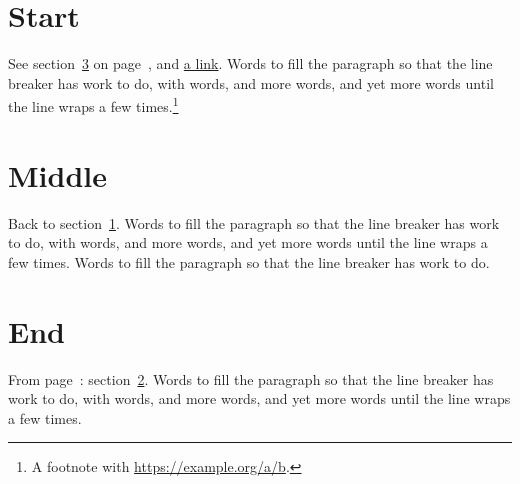 \documentclass{article}
\begin{document}
\tableofcontents
\section{Start}\label{s:start}
See section~\ref{s:end} on page~\pageref{s:end}, and \href{https://example.org}{a
link}. Words to fill the paragraph so that the line breaker has work to do,
with words, and more words, and yet more words until the line wraps a few
times.\footnote{A footnote with \url{https://example.org/a/b}.}

\newpage
\section{Middle}\label{s:middle}
Back to section~\ref{s:start}. Words to fill the paragraph so that the line
breaker has work to do, with words, and more words, and yet more words until
the line wraps a few times. Words to fill the paragraph so that the line
breaker has work to do.

\newpage
\section{End}\label{s:end}
From page~\pageref{s:middle}: section~\ref{s:middle}. Words to fill the
paragraph so that the line breaker has work to do, with words, and more
words, and yet more words until the line wraps a few times.
\end{document}
